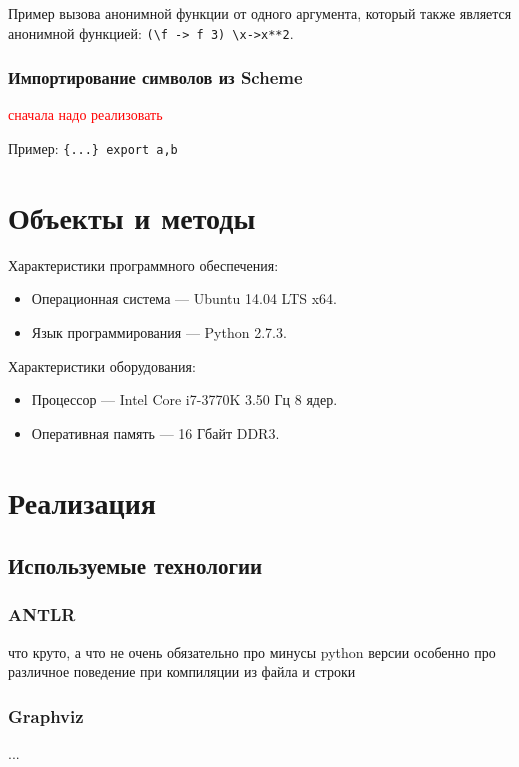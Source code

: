\documentclass[12pt,a4paper,oneside]{extarticle}
\begin{document}
            Пример вызова анонимной функции от одного аргумента, который также является анонимной функцией: \lstinline$(\f -> f 3) \x->x**2$.

        \subsubsection{Импортирование символов из Scheme}
            \textcolor{red}{сначала надо реализовать}

            Пример: \lstinline${...} export a,b$
        
\clearpage

\section{Объекты и методы}
\label{sec:configuration} 
        \noindent Характеристики программного обеспечения:
        \begin{itemize}
            \item Операционная система --- Ubuntu 14.04 LTS x64.
            \item Язык программирования --- Python 2.7.3.
        \end{itemize}
        
        \noindent Характеристики оборудования:
        \begin{itemize}
            \item Процессор --- Intel Core i7-3770K 3.50 Гц 8 ядер.
            \item Оперативная память --- 16 Гбайт DDR3.
        \end{itemize}
\clearpage

\section{Реализация}
    \subsection{Используемые технологии}
        \subsubsection{ANTLR}
            что круто, а что не очень
            обязательно про минусы python версии
            особенно про различное поведение при компиляции из файла и строки %
        \subsubsection{Graphviz}
            ...
\end{document}
